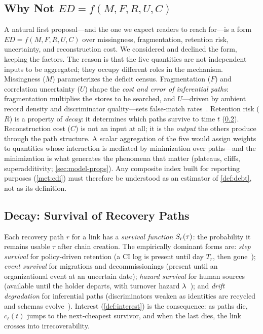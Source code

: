 \subsection{Why Not $ED = f(M, F, R, U, C)$}
\label{sec:model-notformula}

A natural first proposal---and the one we expect readers to reach for---is a form
$ED = f(M, F, R, U, C)$ over missingness, fragmentation, retention risk,
uncertainty, and reconstruction cost. We considered and declined the form, keeping
the factors. The
reason is that the five quantities are not independent inputs to be aggregated; they
occupy different roles in the mechanism. Missingness ($M$) parameterizes the
deficit census. Fragmentation ($F$) and correlation uncertainty ($U$) shape the
\emph{cost and error of inferential paths}: fragmentation multiplies the stores to
be searched, and $U$---driven by ambient record density and discriminator
quality---sets false-match rates~\cite{fellegi1969}. Retention risk ($R$) is a
property of \emph{decay}: it determines which paths survive to time $t$
(\cref{sec:model-decay}). Reconstruction cost ($C$) is not an input at all; it is
the \emph{output} the others produce through the path structure. A scalar
aggregation of the five would assign weights to quantities whose interaction is
mediated by minimization over paths---and the minimization is what generates the
phenomena that matter (plateaus, cliffs, superadditivity; \cref{sec:model-props}).
Any composite index built for reporting purposes (\cref{met:edi}) must therefore be
understood as an estimator of \cref{def:debt}, not as its definition.

\subsection{Decay: Survival of Recovery Paths}
\label{sec:model-decay}

Each recovery path $r$ for a link has a \emph{survival function}
$S_r(\tau)$: the probability it remains usable $\tau$ after chain creation. The
empirically dominant forms are: \emph{step survival} for policy-driven retention
(a CI log is present until day $T_r$, then gone~\cite{nist80092,ghdocs,
cloudtrail}); \emph{event survival} for migrations and decommissionings (present
until an organizational event at an uncertain date); \emph{hazard survival} for
human sources (available until the holder departs, with turnover hazard
$\lambda$~\cite{rigby2016}); and \emph{drift degradation} for inferential paths
(discriminators weaken as identities are recycled and schemas
evolve~\cite{parnas1994,lehman1980}). Interest (\cref{def:interest}) is the
consequence: as paths die, $c_\ell(t)$ jumps to the next-cheapest survivor, and
when the last dies, the link crosses into irrecoverability.

